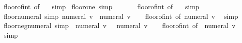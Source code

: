 \begin{isabellebody}
\ floor{\isacharunderscore}{\kern0pt}of{\isacharunderscore}{\kern0pt}int\ {\isacharbrackleft}{\kern0pt}of\ {}{\isacharbrackright}{\kern0pt}\ \isamarkupfalse%
\ simp%
\endisatagproof
{\isafoldproof}%
%
\isadelimproof
\isanewline
%
\endisadelimproof
\isanewline
{}\isamarkupfalse%
\ floor{\isacharunderscore}{\kern0pt}one\ {\isacharbrackleft}{\kern0pt}simp{\isacharbrackright}{\kern0pt}{\isacharcolon}{\kern0pt}\ {\isachardoublequoteopen}{\isasymlfloor}{}{\isasymrfloor}\ {\isacharequal}{\kern0pt}\ {}{\isachardoublequoteclose}\isanewline
%
\isadelimproof
\ \ %
\endisadelimproof
%
\isatagproof
{}\isamarkupfalse%
\ floor{\isacharunderscore}{\kern0pt}of{\isacharunderscore}{\kern0pt}int\ {\isacharbrackleft}{\kern0pt}of\ {}{\isacharbrackright}{\kern0pt}\ \isamarkupfalse%
\ simp%
\endisatagproof
{\isafoldproof}%
%
\isadelimproof
\isanewline
%
\endisadelimproof
\isanewline
{}\isamarkupfalse%
\ floor{\isacharunderscore}{\kern0pt}numeral\ {\isacharbrackleft}{\kern0pt}simp{\isacharbrackright}{\kern0pt}{\isacharcolon}{\kern0pt}\ {\isachardoublequoteopen}{\isasymlfloor}numeral\ v{\isasymrfloor}\ {\isacharequal}{\kern0pt}\ numeral\ v{\isachardoublequoteclose}\isanewline
%
\isadelimproof
\ \ %
\endisadelimproof
%
\isatagproof
{}\isamarkupfalse%
\ floor{\isacharunderscore}{\kern0pt}of{\isacharunderscore}{\kern0pt}int\ {\isacharbrackleft}{\kern0pt}of\ {\isachardoublequoteopen}numeral\ v{\isachardoublequoteclose}{\isacharbrackright}{\kern0pt}\ \isamarkupfalse%
\ simp%
\endisatagproof
{\isafoldproof}%
%
\isadelimproof
\isanewline
%
\endisadelimproof
\isanewline
{}\isamarkupfalse%
\ floor{\isacharunderscore}{\kern0pt}neg{\isacharunderscore}{\kern0pt}numeral\ {\isacharbrackleft}{\kern0pt}simp{\isacharbrackright}{\kern0pt}{\isacharcolon}{\kern0pt}\ {\isachardoublequoteopen}{\isasymlfloor}{\isacharminus}{\kern0pt}\ numeral\ v{\isasymrfloor}\ {\isacharequal}{\kern0pt}\ {\isacharminus}{\kern0pt}\ numeral\ v{\isachardoublequoteclose}\isanewline
%
\isadelimproof
\ \ %
\endisadelimproof
%
\isatagproof
{}\isamarkupfalse%
\ floor{\isacharunderscore}{\kern0pt}of{\isacharunderscore}{\kern0pt}int\ {\isacharbrackleft}{\kern0pt}of\ {\isachardoublequoteopen}{\isacharminus}{\kern0pt}\ numeral\ v{\isachardoublequoteclose}{\isacharbrackright}{\kern0pt}\ \isamarkupfalse%
\ simp%
\endisatagproof
{\isafoldproof}%
%
\isadelimproof
\isanewline
%
\endisadelimproof
\isanewline
{}\isamarkupfalse%

\end{isabellebody}
